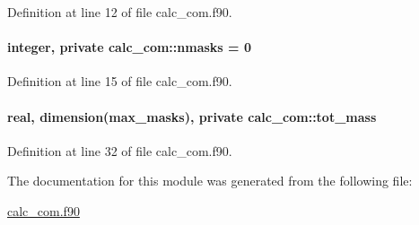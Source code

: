 Definition at line 12 of file calc\-\_\-com.\-f90.

\hypertarget{classcalc__com_a2fc1f6021bedc78c4b1f20a00474eb2d}{
\paragraph[{nmasks}]{\setlength{\rightskip}{0pt plus 5cm}integer, private calc\-\_\-com\-::nmasks = 0\hspace{0.3cm}{\ttfamily [private]}}}\label{classcalc__com_a2fc1f6021bedc78c4b1f20a00474eb2d}


Definition at line 15 of file calc\-\_\-com.\-f90.

\hypertarget{classcalc__com_ad597dba6a1e8852aaeccd64e8055b553}{
\paragraph[{tot\-\_\-mass}]{\setlength{\rightskip}{0pt plus 5cm}real, dimension({\bf max\-\_\-masks}), private calc\-\_\-com\-::tot\-\_\-mass\hspace{0.3cm}{\ttfamily [private]}}}\label{classcalc__com_ad597dba6a1e8852aaeccd64e8055b553}


Definition at line 32 of file calc\-\_\-com.\-f90.



The documentation for this module was generated from the following file\-:\begin{DoxyCompactItemize}
\item 
\hyperlink{calc__com_8f90}{calc\-\_\-com.\-f90}\end{DoxyCompactItemize}
